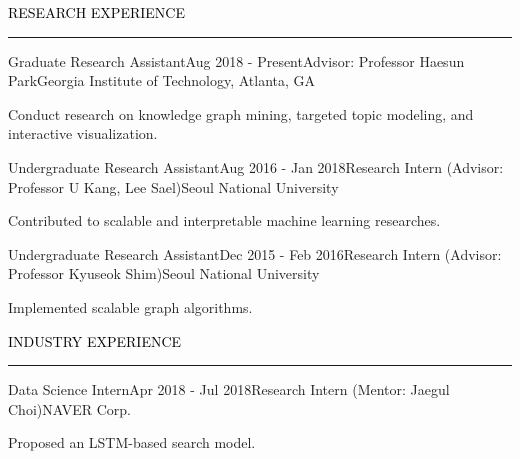 \documentclass{resume} %
\renewenvironment{rSection}[1]{
	\sectionskip
	\textcolor{Black}{\MakeUppercase{#1}}
	\sectionlineskip
	\hrule
	\begin{list}{}{
			\setlength{\leftmargin}{1.5em}
		}
		\item[]
	}{
	\end{list}
}
\begin{document}
\vspace*{-1.0mm}
\begin{rSection}{Research Experience}
\begin{rSubsection}{Graduate Research Assistant}{Aug 2018 - Present}{Advisor: Professor Haesun Park}{Georgia Institute of Technology, Atlanta, GA}
	\item Conduct research on knowledge graph mining, targeted topic modeling, and interactive visualization.
\end{rSubsection}	
\vspace*{-2.5mm}
\begin{rSubsection}{Undergraduate Research Assistant}{Aug 2016 - Jan 2018}{Research Intern (Advisor: Professor U Kang, Lee Sael)}{Seoul National University}
	\item Contributed to scalable and interpretable machine learning researches.
\end{rSubsection}	
\vspace*{-2.5mm}
\begin{rSubsection}{Undergraduate Research Assistant}{Dec 2015 - Feb 2016}{Research Intern (Advisor: Professor Kyuseok Shim)}{Seoul National University}
	\item Implemented scalable graph algorithms.
\end{rSubsection}

\end{rSection}
\vspace{-3mm}


\vspace*{-1.0mm}
\begin{rSection}{Industry Experience}
\begin{rSubsection}{Data Science Intern}{Apr 2018 - Jul 2018}{Research Intern (Mentor: Jaegul Choi)}{NAVER Corp.}
	\item Proposed an LSTM-based search model.
\end{rSubsection}

\end{rSection}
\end{document}
